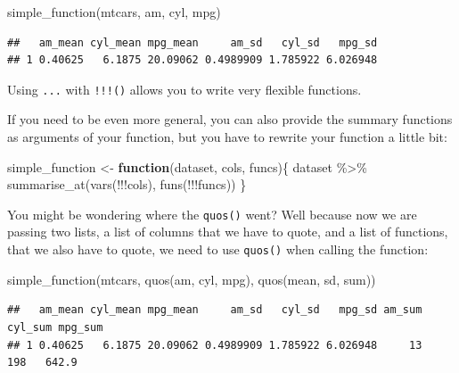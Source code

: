 \documentclass[
]{article}
\newenvironment{Shaded}{\begin{snugshade}}{\end{snugshade}}
\newcommand{\ControlFlowTok}[1]{\textcolor[rgb]{0.13,0.29,0.53}{\textbf{#1}}}
\newcommand{\FunctionTok}[1]{\textcolor[rgb]{0.00,0.00,0.00}{#1}}
\newcommand{\NormalTok}[1]{#1}
\newcommand{\OtherTok}[1]{\textcolor[rgb]{0.56,0.35,0.01}{#1}}
\newcommand{\SpecialCharTok}[1]{\textcolor[rgb]{0.00,0.00,0.00}{#1}}
\begin{document}
\begin{Shaded}
\begin{Highlighting}[]
\FunctionTok{simple\_function}\NormalTok{(mtcars, am, cyl, mpg)}
\end{Highlighting}
\end{Shaded}

\begin{verbatim}
##   am_mean cyl_mean mpg_mean     am_sd   cyl_sd   mpg_sd
## 1 0.40625   6.1875 20.09062 0.4989909 1.785922 6.026948
\end{verbatim}

Using \texttt{...} with \texttt{!!!()} allows you to write very flexible functions.

If you need to be even more general, you can also provide the summary functions as arguments of
your function, but you have to rewrite your function a little bit:

\begin{Shaded}
\begin{Highlighting}[]
\NormalTok{simple\_function }\OtherTok{\textless{}{-}} \ControlFlowTok{function}\NormalTok{(dataset, cols, funcs)\{}
\NormalTok{  dataset }\SpecialCharTok{\%\textgreater{}\%}
    \FunctionTok{summarise\_at}\NormalTok{(}\FunctionTok{vars}\NormalTok{(}\SpecialCharTok{!!!}\NormalTok{cols), }\FunctionTok{funs}\NormalTok{(}\SpecialCharTok{!!!}\NormalTok{funcs))}
\NormalTok{\}}
\end{Highlighting}
\end{Shaded}

You might be wondering where the \texttt{quos()} went? Well because now we are passing two lists, a list of
columns that we have to quote, and a list of functions, that we also have to quote, we need to use \texttt{quos()}
when calling the function:

\begin{Shaded}
\begin{Highlighting}[]
\FunctionTok{simple\_function}\NormalTok{(mtcars, }\FunctionTok{quos}\NormalTok{(am, cyl, mpg), }\FunctionTok{quos}\NormalTok{(mean, sd, sum))}
\end{Highlighting}
\end{Shaded}

\begin{verbatim}
##   am_mean cyl_mean mpg_mean     am_sd   cyl_sd   mpg_sd am_sum cyl_sum mpg_sum
## 1 0.40625   6.1875 20.09062 0.4989909 1.785922 6.026948     13     198   642.9
\end{verbatim}
\end{document}
